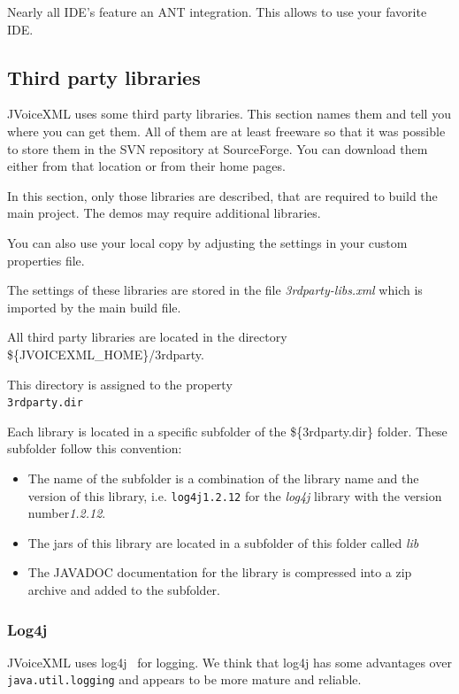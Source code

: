 \documentclass[11pt,a4paper]{article}
\begin{document}
Nearly all IDE's feature an ANT integration. This allows to use
your favorite IDE.

\subsection{Third party libraries}
\label{sec:third-party-libr}

JVoiceXML uses some third party libraries. This section names them and tell
you where you can get them. All of them are at least freeware
so that it was possible to store them in the SVN repository at
SourceForge. You can download them either from that location or
from their home pages. 

In this section, only those libraries are described, that are required
to build the main project. The demos may require additional libraries.

You can also use your local copy by adjusting the settings in your
custom properties file.

The settings of these libraries are stored in the file \emph{3rdparty-libs.xml}
which is imported by the main build file.

All third party libraries are located in the directory \\
\$\{JVOICEXML\_HOME\}/3rdparty.

This directory is assigned to the property \\
\texttt{3rdparty.dir}

Each library is located in a specific subfolder of the \$\{3rdparty.dir\}
folder. These subfolder follow this convention:

\begin{itemize}
\item The name of the subfolder is a combination of the library name and
the version of this library, i.e. \texttt{log4j1.2.12} for the \emph{log4j}
library with the version number\emph{1.2.12}.
\item The jars of this library are located in a subfolder of this folder
called \emph{lib}
\item The JAVADOC documentation for the library is compressed into a zip
archive and added to the subfolder.
\end{itemize}

\subsubsection{Log4j}
\label{sec:log4j}

JVoiceXML uses log4j~\cite{apache:log4j} for logging. We think that log4j has 
some advantages
over \texttt{java.util.logging} and appears to be more mature and reliable.
\end{document}
